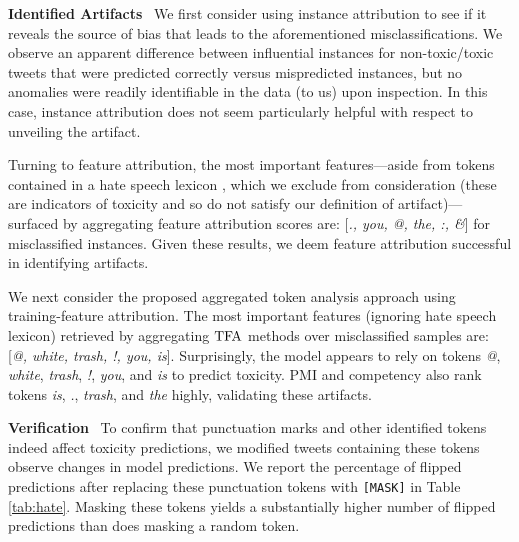 \documentclass[11pt]{article}
\newcommand\para[1]{\vskip 1mm\noindent\textbf{#1}~}
\begin{document}
\para{Identified Artifacts} %
We first consider using instance attribution to see if it reveals the source of bias that leads to the aforementioned misclassifications. 
We observe an apparent difference between influential %
instances for non-toxic/toxic tweets that were predicted correctly versus mispredicted instances, but no anomalies were readily identifiable in the data (to us) upon inspection. 
In this case, instance attribution does not seem  particularly helpful with respect to unveiling the artifact.

Turning to feature attribution, the most important features---aside from tokens contained in a hate speech lexicon \citep{davidson2017automated}, which we exclude from consideration (these are indicators of toxicity and so do not satisfy our definition of artifact)---surfaced by aggregating feature attribution scores are:
[\textit{., you, @, the, :, \&}] for misclassified instances.
Given these results, we deem feature attribution successful in identifying artifacts. 


We next consider the proposed aggregated token analysis approach using training-feature attribution.
 The most important features (ignoring hate speech lexicon) %
 retrieved by aggregating $\text{TFA}$ methods over misclassified samples are: [\textit{@, white, trash, !, you, is}].
Surprisingly, the model appears to rely on tokens \emph{@}, \emph{white}, \emph{trash}, \emph{!}, \emph{you}, and \emph{is} to predict toxicity. 
PMI and competency also rank tokens \emph{is}, \emph{.}, \emph{trash}, and \emph{the} highly, validating these artifacts.


\para{Verification} To confirm that punctuation marks and other identified tokens indeed affect toxicity predictions, we modified tweets containing these tokens observe changes in model predictions.
We report the percentage of flipped predictions after replacing these punctuation tokens with {\tt [MASK]} in Table \ref{tab:hate}. 
Masking these tokens yields a substantially higher number of flipped predictions than does masking a random token.
\end{document}
